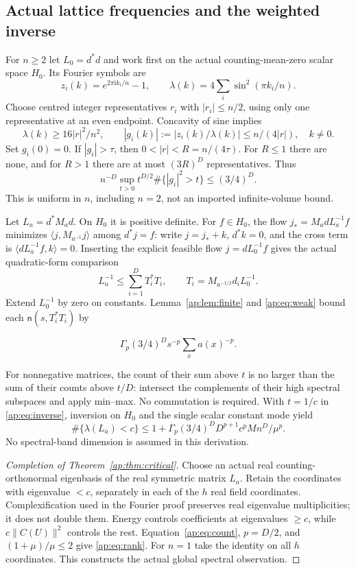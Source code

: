 \documentclass[11pt]{article}
\newcommand{\nct}{\mathsf n}
\begin{document}
\subsection{Actual lattice frequencies and the weighted inverse}
For $n\geq2$ let $L_0=d^*d$ and work first on the actual counting-mean-zero scalar
space $H_0$. Its Fourier symbols are
\[
 z_i(k)=e^{2\pi\mathrm i k_i/n}-1,\qquad
 \lambda(k)=4\sum_i\sin^2(\pi k_i/n).
\]
Choose centred integer representatives $r_i$ with $|r_i|\leq n/2$, using only one
representative at an even endpoint. Concavity of sine implies
\[
 \lambda(k)\geq16|r|^2/n^2,\qquad
 |g_i(k)|:=|z_i(k)/\lambda(k)|\leq n/(4|r|),\quad k\ne0.
\]
Set $g_i(0)=0$. If $|g_i|>\tau$, then $0<|r|<R=n/(4\tau)$.
For $R\leq1$ there are none, and for $R>1$ there are at most $(3R)^D$ representatives.
Thus
\begin{equation}\label{ap:eq:weak}
 n^{-D}\sup_{t>0}t^{D/2}\#\{|g_i|^2>t\}\leq(3/4)^D.
\end{equation}
This is uniform in $n$, including $n=2$, not an imported infinite-volume bound.

Let $L_a=d^*M_ad$. On $H_0$ it is positive definite. For $f\in H_0$, the flow
$j_*=M_adL_a^{-1}f$ minimizes $\langle j,M_{a^{-1}}j\rangle$ among $d^*j=f$:
write $j=j_*+k$, $d^*k=0$, and the cross term is
$\langle dL_a^{-1}f,k\rangle=0$. Inserting the explicit feasible flow
$j=dL_0^{-1}f$ gives the actual quadratic-form comparison
\begin{equation}\label{ap:eq:inverse}
 L_a^{-1}\leq\sum_{i=1}^DT_i^*T_i,\qquad
 T_i=M_{a^{-1/2}}d_iL_0^{-1}.
\end{equation}
Extend $L_0^{-1}$ by zero on constants. Lemma~\ref{ap:lem:finite} and \eqref{ap:eq:weak}
bound each $\nct(s,T_i^*T_i)$ by

\[
 \Gamma_p(3/4)^Ds^{-p}\sum_xa(x)^{-p}.
\]

For nonnegative matrices, the count of their sum above $t$ is no larger than the
sum of their counts above $t/D$: intersect the complements of their high spectral
subspaces and apply min--max. No commutation is required. With $t=1/c$ in
\eqref{ap:eq:inverse}, inversion on $H_0$ and the single scalar constant mode yield
\begin{equation}\label{ap:eq:count}
 \#\{\lambda(L_a)<c\}\leq
 1+\Gamma_p(3/4)^DD^{p+1}c^pM n^D/\mu^p.
\end{equation}
No spectral-band dimension is assumed in this derivation.

\begin{proof}[Completion of Theorem~\ref{ap:thm:critical}]
Choose an actual real counting-orthonormal eigenbasis of the real symmetric matrix
$L_a$. Retain the coordinates with eigenvalue $<c$, separately in each of the $h$
real field coordinates. Complexification used in the Fourier proof preserves real
eigenvalue multiplicities; it does not double them. Energy controls coefficients at
eigenvalues $\geq c$, while $c\|C(U)\|^2$ controls the rest. Equation~\eqref{ap:eq:count},
$p=D/2$, and $(1+\mu)/\mu\leq2$ give \eqref{ap:eq:rank}. For $n=1$ take the identity on all
$h$ coordinates. This constructs the actual global spectral observation.
\end{proof}
\end{document}
